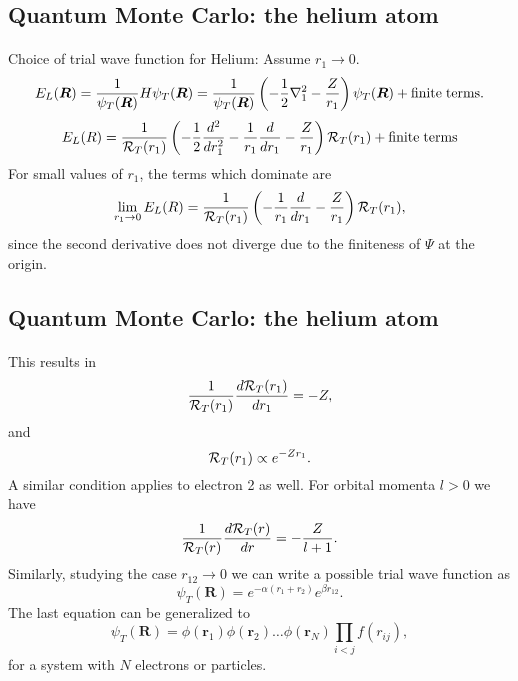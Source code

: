 \documentclass[%
twoside,                 %
final,                   %
10pt]{article}
\begin{document}
\subsection{Quantum Monte Carlo: the helium atom}

\paragraph{}
Choice of trial wave function for Helium:
Assume $r_1 \rightarrow 0$.
\[
   E_L(\bm{R})=\frac{1}{\psi_T(\bm{R})}H\psi_T(\bm{R})=
     \frac{1}{\psi_T(\bm{R})}\left(-\frac{1}{2}\nabla^2_1
     -\frac{Z}{r_1}\right)\psi_T(\bm{R}) + \mathrm{finite \hspace{0.1cm}terms}.
\]
\[ 
    E_L(R)=
    \frac{1}{{\cal R}_T(r_1)}\left(-\frac{1}{2}\frac{d^2}{dr_1^2}-
     \frac{1}{r_1}\frac{d}{dr_1}
     -\frac{Z}{r_1}\right){\cal R}_T(r_1) + \mathrm{finite\hspace{0.1cm} terms}
\]
For small values of $r_1$, the terms which dominate are
\[ 
    \lim_{r_1 \rightarrow 0}E_L(R)=
    \frac{1}{{\cal R}_T(r_1)}\left(-
     \frac{1}{r_1}\frac{d}{dr_1}
     -\frac{Z}{r_1}\right){\cal R}_T(r_1),
\]
since the second derivative does not diverge due to the finiteness of  $\Psi$ at the origin.






\subsection{Quantum Monte Carlo: the helium atom}

\paragraph{}
This results in
\[
     \frac{1}{{\cal R}_T(r_1)}\frac{d {\cal R}_T(r_1)}{dr_1}=-Z,
\]
and
\[
   {\cal R}_T(r_1)\propto e^{-Zr_1}.
\]
A similar condition applies to electron 2 as well. 
For orbital momenta $l > 0$ we have 
\[
     \frac{1}{{\cal R}_T(r)}\frac{d {\cal R}_T(r)}{dr}=-\frac{Z}{l+1}.
\]
Similarly, studying the case $r_{12}\rightarrow 0$ we can write 
a possible trial wave function as
\[
   \psi_T(\bm{R})=e^{-\alpha(r_1+r_2)}e^{\beta r_{12}}.
    \label{eq:wavehelium2}
\]
The last equation can be generalized to
\[
   \psi_T(\bm{R})=\phi(\bm{r}_1)\phi(\bm{r}_2)\dots\phi(\bm{r}_N)
                   \prod_{i < j}f(r_{ij}),
\]
for a system with $N$ electrons or particles.
\end{document}
